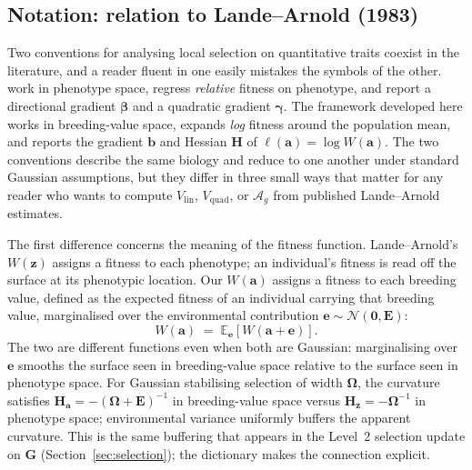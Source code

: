 \documentclass[9pt,twocolumn,twoside,lineno]{gsajnl}
\newcommand{\vect}[1]{\boldsymbol{#1}}
\newcommand{\mat}[1]{\mathbf{#1}}
\newcommand{\Ag}{\ensuremath{\mathcal{A}_{g}}\xspace}
\newcommand{\Vlin}{\ensuremath{V_{\text{lin}}}\xspace}
\newcommand{\Vquad}{\ensuremath{V_{\text{quad}}}\xspace}
\begin{document}
\subsection{Notation: relation to Lande--Arnold (1983)}
\label{sec:notation_dictionary}

Two conventions for analysing local selection on quantitative traits coexist in the literature, and a reader fluent in one easily mistakes the symbols of the other. \citet{LandeArnold1983} work in phenotype space, regress \emph{relative} fitness on phenotype, and report a directional gradient $\bm{\beta}$ and a quadratic gradient $\bm{\gamma}$. The framework developed here works in breeding-value space, expands \emph{log} fitness around the population mean, and reports the gradient $\vect{b}$ and Hessian $\mat{H}$ of $\ell(\vect{a}) = \log W(\vect{a})$. The two conventions describe the same biology and reduce to one another under standard Gaussian assumptions, but they differ in three small ways that matter for any reader who wants to compute $\Vlin$, $\Vquad$, or \Ag from published Lande--Arnold estimates.

The first difference concerns the meaning of the fitness function. Lande--Arnold's $W(\vect{z})$ assigns a fitness to each phenotype; an individual's fitness is read off the surface at its phenotypic location. Our $W(\vect{a})$ assigns a fitness to each breeding value, defined as the expected fitness of an individual carrying that breeding value, marginalised over the environmental contribution $\vect{e}\sim\mathcal{N}(\vect{0},\mat{E})$:
\begin{equation}
W(\vect{a}) \;=\; \mathbb{E}_{\vect{e}}\!\left[W(\vect{a}+\vect{e})\right].
\label{eq:Wa_definition}
\end{equation}
The two are different functions even when both are Gaussian: marginalising over $\vect{e}$ smooths the surface seen in breeding-value space relative to the surface seen in phenotype space. For Gaussian stabilising selection of width $\bm{\Omega}$, the curvature satisfies $\mat{H}_{\vect{a}} = -(\bm{\Omega}+\mat{E})^{-1}$ in breeding-value space versus $\mat{H}_{\vect{z}} = -\bm{\Omega}^{-1}$ in phenotype space; environmental variance uniformly buffers the apparent curvature. This is the same buffering that appears in the Level~2 selection update on $\mat{G}$ (Section~\ref{sec:selection}); the dictionary makes the connection explicit.
\end{document}
